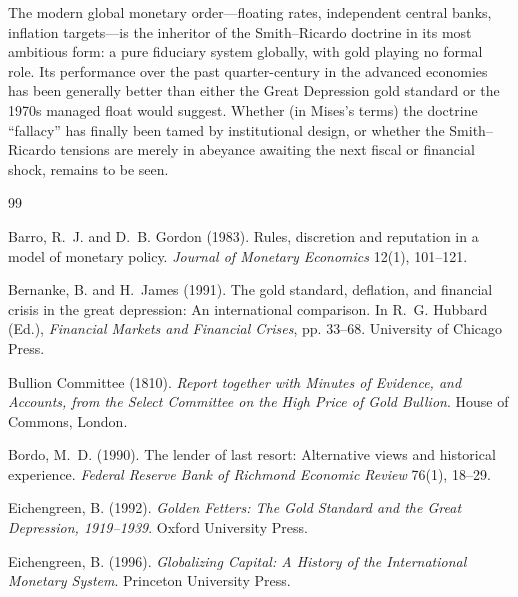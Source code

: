 \documentclass[12pt]{article}
\begin{document}
The modern global monetary order---floating rates, independent
central banks, inflation targets---is the inheritor of the
Smith--Ricardo doctrine in its most ambitious form: a pure fiduciary
system globally, with gold playing no formal role.  Its performance
over the past quarter-century in the advanced economies has been
generally better than either the Great Depression gold standard or
the 1970s managed float would suggest.  Whether (in Mises's terms)
the doctrine ``fallacy'' has finally been tamed by institutional
design, or whether the Smith--Ricardo tensions are merely in
abeyance awaiting the next fiscal or financial shock, remains
to be seen.

\bigskip


\begin{thebibliography}{99}

Barro, R.~J. and D.~B. Gordon (1983).
\newblock Rules, discretion and reputation in a model of monetary policy.
\newblock \textit{Journal of Monetary Economics} 12(1), 101--121.

Bernanke, B. and H.~James (1991).
\newblock The gold standard, deflation, and financial crisis in the great
  depression: An international comparison.
\newblock In R.~G. Hubbard (Ed.), \textit{Financial Markets and Financial
  Crises}, pp. 33--68. University of Chicago Press.

{Bullion Committee} (1810).
\newblock \textit{Report together with Minutes of Evidence, and Accounts, from
  the Select Committee on the High Price of Gold Bullion}.
\newblock House of Commons, London.

Bordo, M.~D. (1990).
\newblock The lender of last resort: Alternative views and historical
  experience.
\newblock \textit{Federal Reserve Bank of Richmond Economic Review} 76(1),
  18--29.

Eichengreen, B. (1992).
\newblock \textit{Golden Fetters: The Gold Standard and the Great Depression,
  1919--1939}.
\newblock Oxford University Press.

Eichengreen, B. (1996).
\newblock \textit{Globalizing Capital: A History of the International Monetary
  System}.
\newblock Princeton University Press.


\end{thebibliography}
\end{document}
